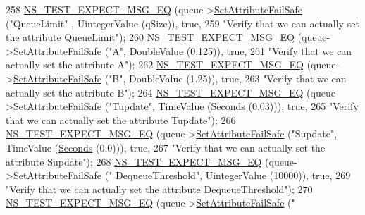 \begin{DoxyCode}
258   \hyperlink{group__testing_ga7304ba46a28d8cf08dfdfd6499cf7068}{NS\_TEST\_EXPECT\_MSG\_EQ} (queue->\hyperlink{classns3_1_1ObjectBase_aa7d333004e970f925a4ed5df275541b5}{SetAttributeFailSafe} (\textcolor{stringliteral}{"QueueLimit"}
      , UintegerValue (qSize)), \textcolor{keyword}{true},
259                          \textcolor{stringliteral}{"Verify that we can actually set the attribute QueueLimit"});
260   \hyperlink{group__testing_ga7304ba46a28d8cf08dfdfd6499cf7068}{NS\_TEST\_EXPECT\_MSG\_EQ} (queue->\hyperlink{classns3_1_1ObjectBase_aa7d333004e970f925a4ed5df275541b5}{SetAttributeFailSafe} (\textcolor{stringliteral}{"A"}, 
      DoubleValue (0.125)), \textcolor{keyword}{true},
261                          \textcolor{stringliteral}{"Verify that we can actually set the attribute A"});
262   \hyperlink{group__testing_ga7304ba46a28d8cf08dfdfd6499cf7068}{NS\_TEST\_EXPECT\_MSG\_EQ} (queue->\hyperlink{classns3_1_1ObjectBase_aa7d333004e970f925a4ed5df275541b5}{SetAttributeFailSafe} (\textcolor{stringliteral}{"B"}, 
      DoubleValue (1.25)), \textcolor{keyword}{true},
263                          \textcolor{stringliteral}{"Verify that we can actually set the attribute B"});
264   \hyperlink{group__testing_ga7304ba46a28d8cf08dfdfd6499cf7068}{NS\_TEST\_EXPECT\_MSG\_EQ} (queue->\hyperlink{classns3_1_1ObjectBase_aa7d333004e970f925a4ed5df275541b5}{SetAttributeFailSafe} (\textcolor{stringliteral}{"Tupdate"}, 
      TimeValue (\hyperlink{group__timecivil_ga33c34b816f8ff6628e33d5c8e9713b9e}{Seconds} (0.03))), \textcolor{keyword}{true},
265                          \textcolor{stringliteral}{"Verify that we can actually set the attribute Tupdate"});
266   \hyperlink{group__testing_ga7304ba46a28d8cf08dfdfd6499cf7068}{NS\_TEST\_EXPECT\_MSG\_EQ} (queue->\hyperlink{classns3_1_1ObjectBase_aa7d333004e970f925a4ed5df275541b5}{SetAttributeFailSafe} (\textcolor{stringliteral}{"Supdate"}, 
      TimeValue (\hyperlink{group__timecivil_ga33c34b816f8ff6628e33d5c8e9713b9e}{Seconds} (0.0))), \textcolor{keyword}{true},
267                          \textcolor{stringliteral}{"Verify that we can actually set the attribute Supdate"});
268   \hyperlink{group__testing_ga7304ba46a28d8cf08dfdfd6499cf7068}{NS\_TEST\_EXPECT\_MSG\_EQ} (queue->\hyperlink{classns3_1_1ObjectBase_aa7d333004e970f925a4ed5df275541b5}{SetAttributeFailSafe} (\textcolor{stringliteral}{"
      DequeueThreshold"}, UintegerValue (10000)), \textcolor{keyword}{true},
269                          \textcolor{stringliteral}{"Verify that we can actually set the attribute DequeueThreshold"});
270   \hyperlink{group__testing_ga7304ba46a28d8cf08dfdfd6499cf7068}{NS\_TEST\_EXPECT\_MSG\_EQ} (queue->\hyperlink{classns3_1_1ObjectBase_aa7d333004e970f925a4ed5df275541b5}{SetAttributeFailSafe} (\textcolor{stringliteral}{"
}
\end{DoxyCode}
